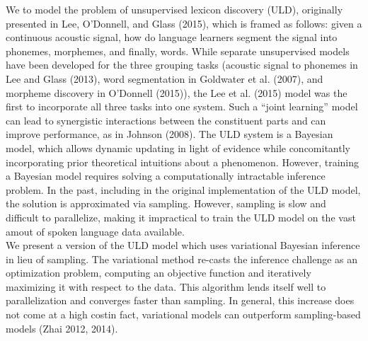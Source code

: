 \documentclass[12pt,letterpaper]{article}
\newcommand\tab[1][1cm]{\hspace*{#1}}
\newif\ifcomments
\newcommand{\cm}[1]{\textcolor{purple}{\ifcomments[COMMENT: #1]\else\fi}}
\renewcommand{\d}[1]{\textcolor{lime}{\ifcomments[DELETED: #1]\else\fi}}
\begin{document}
\tab \cm{tabs unnecessary in abstract} We \d{attempt} to model the problem of unsupervised lexicon discovery (ULD), originally presented in Lee, O'Donnell, and Glass (2015), which is framed as follows: given a continuous acoustic signal, how do language learners segment the signal into phonemes, morphemes, and finally, words.\cm{this is a bit convoluted ``we attempt to model the problem..'' LOG is a model, not a problem. The problem is learning units at multiple grain sizes (phones, morphemes, etc.) directly from the acoustic input. You should get to that at the end of the first paragraph and then in the beginning here basically say ``a state of the art model of this is LOG''...}
 While separate unsupervised models have been developed for the three grouping tasks (acoustic signal to phonemes in Lee and Glass (2013), word segmentation in Goldwater et al. (2007)\cm{I wouldn't introduce this in a ``while'' clause---it sounds apologetic and deflationary. Just say we were the first to jointly model these earlier tasks. }, and morpheme discovery in O'Donnell (2015)), the Lee et al. (2015) model was the first to incorporate all three tasks into one system. Such a ``joint learning'' model can lead to synergistic interactions between the constituent parts and can improve performance, as in Johnson (2008).\cm{no ``as in'' just the citation.} The ULD system is a Bayesian model, which allows  dynamic updating in light of evidence while concomitantly incorporating prior theoretical intuitions about a phenomenon.\cm{preceding sentence is redundant. Just say that LOG introduce a bayesian joint model of these various earlier efforts.} However, training a Bayesian model requires solving a computationally intractable inference problem.\cm{relative preceding statement to \emph{this} model---not all bayesian models are intractable (though almost all are)---e.g., a simple gaussian with conjugate priors.} In the past, including in the original implementation of the ULD model, the solution is approximated via sampling.\cm{slightly incorrect jargon---say that inference was implemented using sampling-based approaches} However, sampling is slow and difficult to parallelize, making it impractical to train the ULD model on the vast amout of spoken language data available. \\
\tab We present a version of the ULD model which uses variational Bayesian inference in lieu of sampling. The variational method re-casts the inference challenge as an optimization problem, computing an objective function and iteratively maximizing it with respect to the data. This algorithm lends itself well to parallelization and converges faster than sampling. In general, this increase does not come at a high cost\textemdash in fact, variational models can outperform sampling-based models (Zhai 2012, 2014).\cm{This last aside is a bit too vague---what do you mean that they can outperform, what cost was implied in the beginning.}\\
\end{document}
